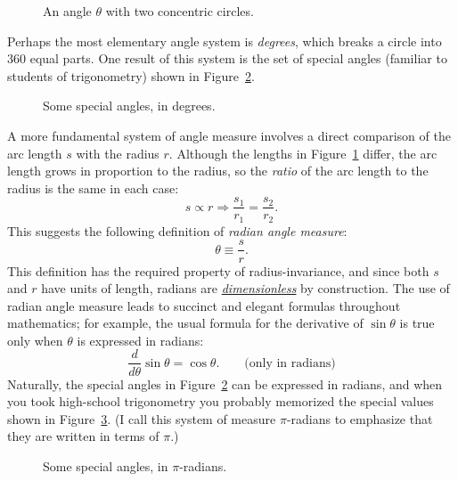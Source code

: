 \begin{figure}
\begin{center}
\end{center}
\caption{An angle $\theta$ with two concentric circles.\label{fig:angle_arclength}}
\end{figure}

Perhaps the most elementary angle system is \emph{degrees}, which breaks a circle into 360 equal parts. One result of this system is the set of special angles (familiar to students of trigonometry) shown in Figure~\ref{fig:degree_angles}.

\begin{figure}
\begin{center}
\end{center}
\caption{Some special angles, in degrees.\label{fig:degree_angles}}
\end{figure}

A more fundamental system of angle measure involves a direct comparison of the arc length $s$ with the radius $r$. Although the lengths in Figure~\ref{fig:angle_arclength} differ, the arc length grows in proportion to the radius, so the \emph{ratio} of the arc length to the radius is the same in each case:
\[
s\propto r \Rightarrow \frac{s_1}{r_1} = \frac{s_2}{r_2}.
\]
This suggests the following definition of \emph{radian angle measure}:
\begin{equation}
\label{eq:radians}
\theta \equiv \frac{s}{r}.
\end{equation}
This definition has the required property of radius-invariance, and since both $s$ and $r$ have units of length, radians are \href{https://en.wikipedia.org/wiki/Dimensionless_quantity}{\emph{dimensionless}} by construction. The use of radian angle measure leads to succinct and elegant formulas throughout mathematics; for example, the usual formula for the derivative of $\sin\theta$ is true only when $\theta$ is expressed in radians:
\[
  \frac{d}{d\theta}\sin\theta = \cos\theta. \qquad\mbox{(only in radians)}
\]
Naturally, the special angles in Figure~\ref{fig:degree_angles} can be expressed in radians, and when you took high-school trigonometry you probably memorized the special values shown in Figure~\ref{fig:pi_angles}. (I call this system of measure $\pi$-radians to emphasize that they are written in terms of $\pi$.)

\begin{figure}
\begin{center}
\end{center}
\caption{Some special angles, in $\pi$-radians.\label{fig:pi_angles}}
\end{figure}

